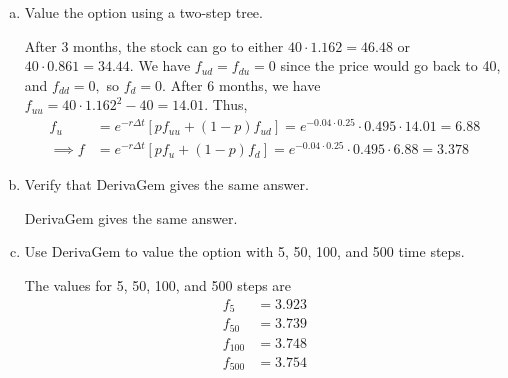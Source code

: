 \documentclass{article}
\begin{document}
\begin{itemize}
\begin{enumerate}[(a)]
			\item Value the option using a two-step tree.
				\begin{soln}
					After 3 months, the stock can go to either $40\cdot 1.162=46.48$ or $40\cdot 0.861 = 34.44.$ We have $f_{ud}=f_{du} = 0$ since the price would go back to 40, and $f_{dd}=0,$ so $f_d = 0.$ After 6 months, we have $f_{uu}=40\cdot 1.162^2 - 40 = 14.01.$ Thus,
					\begin{align*}
						f_u &= e^{-r\Delta t} [pf_{uu} + (1-p)f_{ud}] = e^{-0.04\cdot 0.25}\cdot 0.495\cdot 14.01 = 6.88 \\
						\implies f &= e^{-r\Delta t}[pf_u+(1-p)f_d] = e^{-0.04\cdot 0.25} \cdot 0.495\cdot 6.88 = \boxed{3.378}
					\end{align*}
				\end{soln}

			\item Verify that DerivaGem gives the same answer.
				\begin{answer*}
					DerivaGem gives the same answer.
				\end{answer*}

			\item Use DerivaGem to value the option with 5, 50, 100, and 500 time steps.
				\begin{soln}
					The values for 5, 50, 100, and 500 steps are
					\begin{align*}
						f_5 &= 3.923 \\
						f_{50} &= 3.739 \\
						f_{100} &= 3.748 \\
						f_{500} &= 3.754
					\end{align*}
				\end{soln}
				
		\end{enumerate}

\end{itemize}
\end{document}

